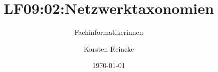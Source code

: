 \documentclass[]{beamer}
\title{LF09:02:Netzwerktaxonomien}
\subtitle{Fachinformatikerinnen}
\institute{GS-LDK}
\author{Karsten Reincke}
\date{\today}
\def\cfgGl{../../../cfg.gl/}
\begin{document}

\begin{frame}
  \titlepage
\end{frame}






\logo{}
\newpage



%
\end{document}
